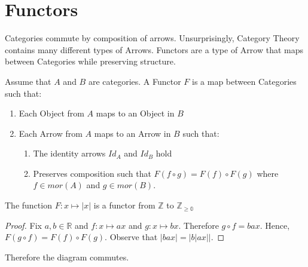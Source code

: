\documentclass{article}
\begin{document}
\section{Functors}
Categories commute by composition of arrows. Unsurprisingly, Category Theory contains many different types of Arrows. Functors are a type of Arrow that maps between Categories while preserving structure.
\begin{definition}
    Assume that $A$ and $B$ are categories. A Functor $F$ is a map between Categories such that:
    \begin{enumerate}
        \item Each Object from $A$ maps to an Object in $B$
        \item Each Arrow from $A$ maps to an Arrow in $B$ such that:
        \begin{enumerate}
            \item The identity arrows  $Id_A$ and $Id_B$ hold
            \item Preserves composition such that $F(f \circ g) = F(f)\circ F(g)$ where $f \in mor(A)$ and $g \in mor(B)$.
        \end{enumerate}
    \end{enumerate}
\end{definition}

\begin{theorem}
The function $F: x \mapsto |x|$ is a functor from $\mathbb{Z}$ to $\mathbb{Z_{\ge 0}}$
\end{theorem}
\begin{proof}
Fix $a,b \in \mathbb{R}$ and $f: x \mapsto ax$ and $g: x \mapsto bx$. Therefore $g \circ f = bax$. Hence, $F(g \circ f) = F(f) \circ F(g)$. Observe that $|bax| = |b|ax||$.
\end{proof}
\begin{center}
\end{center}
Therefore the diagram commutes.



\end{document}

